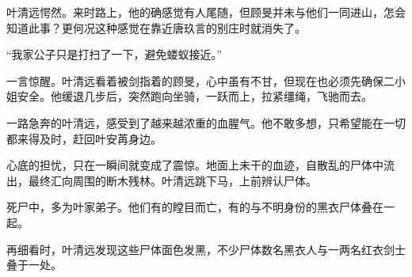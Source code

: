 叶清远愕然。来时路上，他的确感觉有人尾随，但顾旻并未与他们一同进山，怎会知道此事？更何况这种感觉在靠近唐玖言的别庄时就消失了。

“我家公子只是打扫了一下，避免蝼蚁接近。”

一言惊醒。叶清远看着被剑指着的顾旻，心中虽有不甘，但现在也必须先确保二小姐安全。他缓退几步后，突然跑向坐骑，一跃而上，拉紧缰绳，飞驰而去。

一路急奔的叶清远，感受到了越来越浓重的血腥气。他不敢多想，只希望能在一切都来得及时，赶回叶安苒身边。

心底的担忧，只在一瞬间就变成了震惊。地面上未干的血迹，自散乱的尸体中流出，最终汇向周围的断木残林。叶清远跳下马，上前辨认尸体。

死尸中，多为叶家弟子。他们有的瞠目而亡，有的与不明身份的黑衣尸体叠在一起。

再细看时，叶清远发现这些尸体面色发黑，不少尸体数名黑衣人与一两名红衣剑士叠于一处。